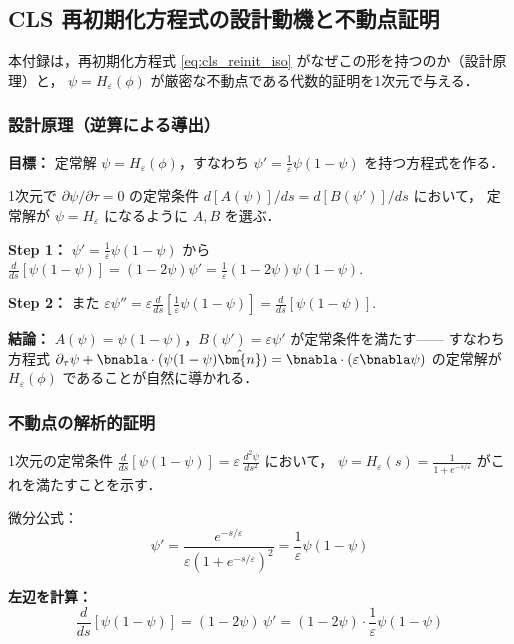 \subsection{CLS 再初期化方程式の設計動機と不動点証明}
\label{app:cls_fixed_point}

本付録は，再初期化方程式 \eqref{eq:cls_reinit_iso} がなぜこの形を持つのか（設計原理）と，
$\psi = H_\varepsilon(\phi)$ が厳密な不動点である代数的証明を1次元で与える．

\subsubsection*{設計原理（逆算による導出）}

\textbf{目標：} 定常解 $\psi = H_\varepsilon(\phi)$，すなわち $\psi' = \frac{1}{\varepsilon}\psi(1-\psi)$ を持つ方程式を作る．

1次元で $\partial\psi/\partial\tau = 0$ の定常条件 $d[A(\psi)]/ds = d[B(\psi')]/ds$ において，
定常解が $\psi = H_\varepsilon$ になるように $A,B$ を選ぶ．

\textbf{Step 1：} $\psi' = \frac{1}{\varepsilon}\psi(1-\psi)$ から
$\frac{d}{ds}[\psi(1-\psi)] = (1-2\psi)\psi' = \frac{1}{\varepsilon}(1-2\psi)\psi(1-\psi)$.

\textbf{Step 2：} また $\varepsilon\psi'' = \varepsilon\frac{d}{ds}[\frac{1}{\varepsilon}\psi(1-\psi)] = \frac{d}{ds}[\psi(1-\psi)]$.

\textbf{結論：} $A(\psi) = \psi(1-\psi)$，$B(\psi') = \varepsilon\psi'$ が定常条件を満たす——
すなわち方程式 $\partial_\tau\psi + \bnabla\cdot(\psi(1-\psi)\hat{\bm{n}}) = \bnabla\cdot(\varepsilon\bnabla\psi)$
の定常解が $H_\varepsilon(\phi)$ であることが自然に導かれる．

\subsubsection*{不動点の解析的証明}

1次元の定常条件 $\frac{d}{ds}[\psi(1-\psi)] = \varepsilon\,\frac{d^2\psi}{ds^2}$ において，
$\psi = H_\varepsilon(s) = \frac{1}{1+e^{-s/\varepsilon}}$ がこれを満たすことを示す．

微分公式：
\[
  \psi' = \frac{e^{-s/\varepsilon}}{\varepsilon(1+e^{-s/\varepsilon})^2} = \frac{1}{\varepsilon}\psi(1-\psi)
\]

\textbf{左辺を計算：}
\[
  \frac{d}{ds}[\psi(1-\psi)]
  = (1-2\psi)\,\psi'
  = (1-2\psi)\cdot\frac{1}{\varepsilon}\psi(1-\psi)
\]

